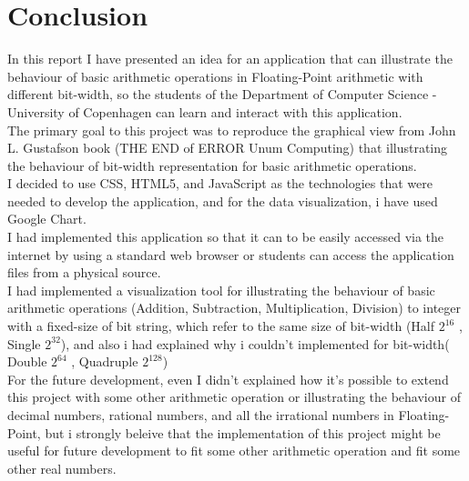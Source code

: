 \documentclass[11pt]{article}
\begin{document}
\section{Conclusion}
In this report I have presented an idea for an application that can illustrate the behaviour of basic arithmetic operations in Floating-Point arithmetic with different bit-width, so the students of the Department of Computer Science - University of Copenhagen can learn and interact with this application.\\

The primary goal to this project was to reproduce the graphical view from John L. Gustafson book (THE END of ERROR Unum Computing) that illustrating the behaviour of bit-width representation for basic arithmetic operations.\\

I decided to use CSS, HTML5, and JavaScript as the technologies that were needed to develop the application, and for the data visualization, i have used Google Chart.\\

I had implemented this application so that it can to be easily accessed via the internet by using a standard web browser or students can access the application files from a physical source.\\

I had implemented a visualization tool for illustrating the behaviour of basic arithmetic operations (Addition, Subtraction, Multiplication, Division) to integer with a fixed-size of bit string, which refer to the same size of bit-width (Half $2^{16}$ , Single $2^{32}$), and also i had explained why i couldn't implemented for  bit-width( Double $2^{64}$ , Quadruple $2^{128}$)\\

For the future development, even I didn't explained how it's possible to extend this project with some other arithmetic operation or illustrating the behaviour of decimal numbers, rational numbers, and all the irrational numbers in Floating-Point, but i strongly beleive that the implementation of this project might be useful for  future development to fit some other arithmetic operation and fit some other real numbers.
\end{document}
